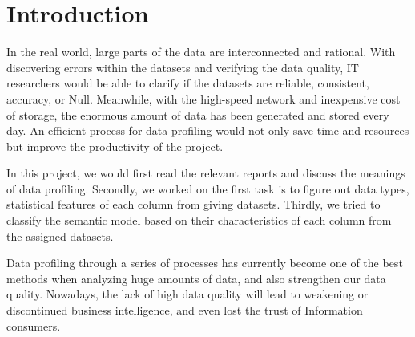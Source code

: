 \documentclass[sigconf]{acmart}
\begin{document}

\maketitle

\section{Introduction}
In the real world, large parts of the data are interconnected and rational. With discovering errors within the datasets and verifying the data quality, IT researchers would be able to clarify if the datasets are reliable, consistent, accuracy, or Null. 
Meanwhile, with the high-speed network and inexpensive cost of storage, the enormous amount of data has been generated and stored every day. An efficient process for data profiling would not only save time and resources but improve the productivity of the project. 

In this project, we would first read the relevant reports and discuss the meanings of data profiling. Secondly, we worked on the first task is to figure out data types, statistical features of each column from giving datasets. Thirdly, we tried to classify the semantic model based on their characteristics of each column from the assigned datasets.

Data profiling through a series of processes has currently become one of the best methods when analyzing huge amounts of data, and also strengthen our data quality. Nowadays, the lack of high data quality will lead to weakening or discontinued business intelligence, and even lost the trust of Information consumers.
\end{document}
